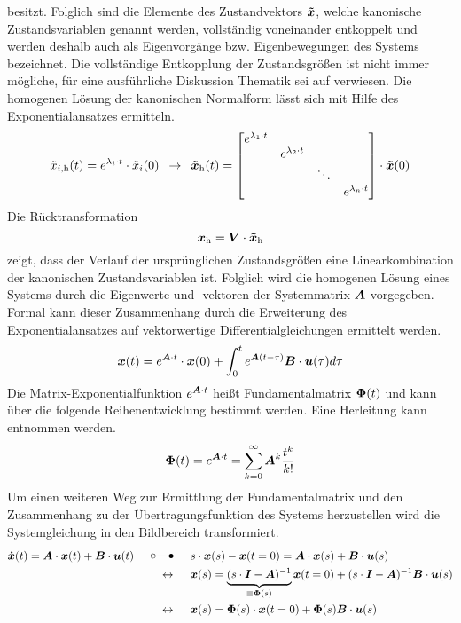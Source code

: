 besitzt. Folglich sind die Elemente des Zustandvektors $\boldsymbol{\tilde{x}}$, welche kanonische Zustandsvariablen genannt werden, vollständig voneinander entkoppelt und werden deshalb auch als Eigenvorgänge bzw. Eigenbewegungen des Systems bezeichnet. Die vollständige Entkopplung der Zustandsgrößen ist nicht immer mögliche, für eine ausführliche Diskussion Thematik sei auf \cite[S. 135 ff.]{LunzeRT1} verwiesen.
Die homogenen Lösung der kanonischen Normalform lässt sich mit Hilfe des Exponentialansatzes ermitteln.
\begin{equation}
\tilde{x}_{i\text{,h}}(t) = e^{\lambda_i\cdot t}\cdot \tilde{x}_i(0) \hspace{5pt}\rightarrow\hspace{5pt} \boldsymbol{\tilde{x}}_{\text{h}}(t) = \begin{bmatrix}
e^{\lambda_{\text{1}}\cdot t} &  & \\
& e^{\lambda_{\text{2}}\cdot t}  & \\
&  & \ddots & \\
&  & & e^{\lambda_n\cdot t}
\end{bmatrix}\cdot \boldsymbol{\tilde{x}}(0)
\end{equation}
Die Rücktransformation
\begin{equation}
\boldsymbol{x}_{\text{h}} = \boldsymbol{V}\cdot \boldsymbol{\tilde{x}}_{\text{h}}
\end{equation}
zeigt, dass der Verlauf der ursprünglichen Zustandsgrößen eine Linearkombination der kanonischen Zustandsvariablen ist. Folglich wird die homogenen Lösung eines Systems durch die Eigenwerte und -vektoren der Systemmatrix $\boldsymbol{A}$ vorgegeben. 
Formal kann dieser Zusammenhang durch die Erweiterung des Exponentialansatzes auf vektorwertige Differentialgleichungen ermittelt werden.
\begin{equation}
\boldsymbol{x}(t) = e^{\boldsymbol{A}\cdot t}\cdot \boldsymbol{x}(0) + \int^t_0 e^{\boldsymbol{A}(t-\tau)}\boldsymbol{B}\cdot \boldsymbol{u}(\tau)d\tau
\label{eq_fMat_zeitbereich}
\end{equation}
Die Matrix-Exponentialfunktion $e^{\boldsymbol{A}\cdot t}$ heißt Fundamentalmatrix $\boldsymbol{\Phi}(t)$ und kann über die folgende Reihenentwicklung bestimmt werden. Eine Herleitung kann \cite[S. 6 ff.]{UnbehauenRT2} entnommen werden. 
\begin{equation}
\boldsymbol{\Phi}(t) = e^{\boldsymbol{A}\cdot t} = \sum^{\infty}_{k=0} \boldsymbol{A}^k\frac{t^k}{k!}
\end{equation}
Um einen weiteren Weg zur Ermittlung der Fundamentalmatrix und den Zusammenhang zu der Übertragungsfunktion des Systems herzustellen wird die Systemgleichung in den Bildbereich transformiert.
\begin{equation}
\begin{split}
\bs{\dot{x}}(t) = \bs{A}\cdot \bs{x}(t) + \bs{B}\cdot\bs{u}(t) \myLaplace &s\cdot\bs{x}(s) - \bs{x}(t=0) = \bs{A}\cdot \bs{x}(s) + \bs{B}\cdot \bs{u}(s)
\\
\leftrightarrow \hspace{15pt} &\bs{x}(s) = \underbrace{(s\cdot \bs{I} - \bs{A})^{-1}}_{\equiv \bs{\Phi}(s)}\bs{x}(t=0) + (s\cdot \bs{I}-\bs{A})^{-1}\bs{B}\cdot \bs{u}(s) 
\\
\leftrightarrow \hspace{15pt}&\bs{x}(s) = \bs{\Phi}(s)\cdot \bs{x}(t=0) +\bs{\Phi}(s)\bs{B}\cdot \bs{u}(s)
\end{split}
\label{eq_fMat_bildbereich}
\end{equation}

